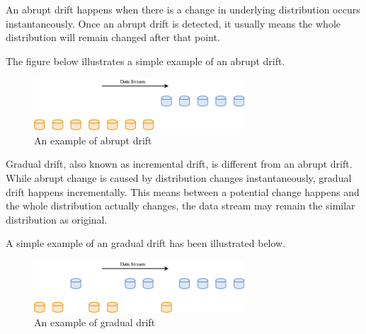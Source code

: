\begin{definition}
\label{abruptdrift}
An abrupt drift happens when there is a change in underlying distribution occurs instantaneously. Once an abrupt drift is detected, it usually means the whole distribution will remain changed after that point. 
\end{definition}
The figure below illustrates a simple example of an abrupt drift.

\begin{figure}[h!]
    \centering
    \includegraphics[width=0.7\textwidth]{RelatedWorks/abrupt.png}
    \caption{An example of abrupt drift}
    \label{fig:abrupt}
\end{figure}


\begin{definition}
\label{gradualdrift}
Gradual drift, also known as incremental drift, is different from an abrupt drift. While abrupt change is caused by distribution changes instantaneously, gradual drift happens incrementally. This means between a potential change happens and the whole distribution actually changes, the data stream may remain the similar distribution as original.
\end{definition}

A simple example of an gradual drift has been illustrated below.

\begin{figure}[h!]
    \centering
    \includegraphics[width=0.7\textwidth]{RelatedWorks/gradual.png}
    \caption{An example of gradual drift}
    \label{fig:gradual}
\end{figure}

